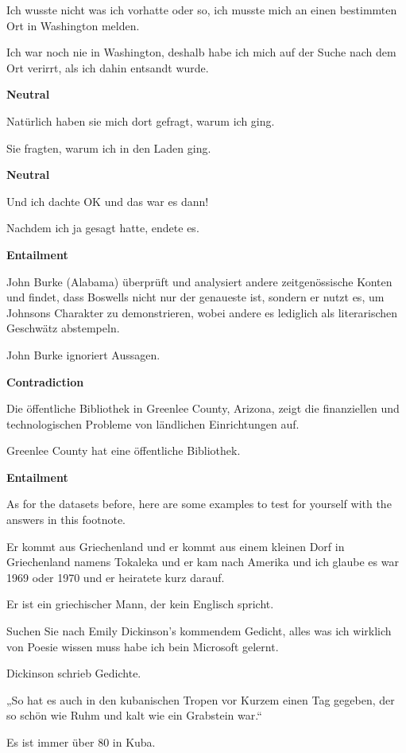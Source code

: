 \begin{examples}
  \label{ex:xnli}
  \item Ich wusste nicht was ich vorhatte oder so, ich musste mich an einen bestimmten Ort in Washington melden.

        Ich war noch nie in Washington, deshalb habe ich mich auf der Suche nach dem Ort verirrt, als ich dahin entsandt wurde.

        \textbf{Neutral}
  \item Natürlich haben sie mich dort gefragt, warum ich ging.

        Sie fragten, warum ich in den Laden ging.

        \textbf{Neutral}
  \item Und ich dachte OK und das war es dann!

        Nachdem ich ja gesagt hatte, endete es.

        \textbf{Entailment}
  \item John Burke (Alabama) überprüft und analysiert andere zeitgenössische Konten und findet, dass Boswells nicht nur der genaueste ist, sondern er nutzt es, um Johnsons Charakter zu demonstrieren, wobei andere es lediglich als literarischen Geschwätz abstempeln.

        John Burke ignoriert Aussagen.

        \textbf{Contradiction}
  \item Die öffentliche Bibliothek in Greenlee County, Arizona, zeigt die finanziellen und technologischen Probleme von ländlichen Einrichtungen auf.

        Greenlee County hat eine öffentliche Bibliothek.

        \textbf{Entailment}
\end{examples}

As for the datasets before, here are some examples to test for yourself with the answers in
this footnote.

\begin{examples}
  \item \label{itm:xnli1} Er kommt aus Griechenland und er kommt aus einem kleinen Dorf in Griechenland namens Tokaleka und er kam nach Amerika und ich glaube es war 1969 oder 1970 und er heiratete kurz darauf.

        Er ist ein griechischer Mann, der kein Englisch spricht.
  \item \label{itm:xnli2} Suchen Sie nach Emily Dickinson's kommendem Gedicht, alles was ich wirklich von Poesie wissen muss habe ich bein Microsoft gelernt.

        Dickinson schrieb Gedichte.
  \item \label{itm:xnli3} „So hat es auch in den kubanischen Tropen vor Kurzem einen Tag gegeben, der so schön wie Ruhm und kalt wie ein Grabstein war.“

        Es ist immer über 80 in Kuba.
\end{examples}

